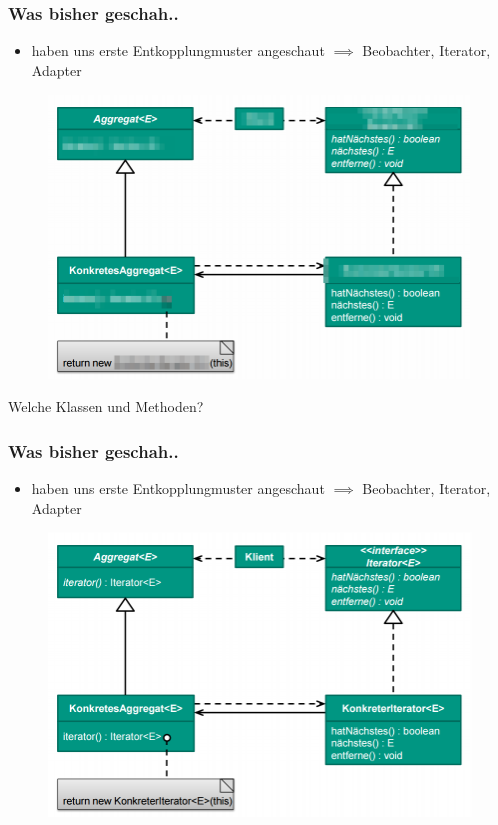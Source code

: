 \documentclass[18pt]{beamer}
\begin{document}
	\begin{frame}
		\frametitle{Was bisher geschah..}
		\begin{itemize}
			\item haben uns erste Entkopplungmuster angeschaut
			\linebreak $\implies$ Beobachter, Iterator, Adapter
		\end{itemize}
		\begin{figure}
			\includegraphics[scale=0.25]{./pics/tut4/iter-mod.png}
		\end{figure}
		Welche Klassen und Methoden?
	\end{frame}
	
	\begin{frame}
		\frametitle{Was bisher geschah..}
		\begin{itemize}
			\item haben uns erste Entkopplungmuster angeschaut
			\linebreak $\implies$ Beobachter, Iterator, Adapter
		\end{itemize}
		\begin{figure}
			\includegraphics[scale=0.35]{./pics/tut3/iter.png}
		\end{figure}
	\end{frame}
	
\end{document}
